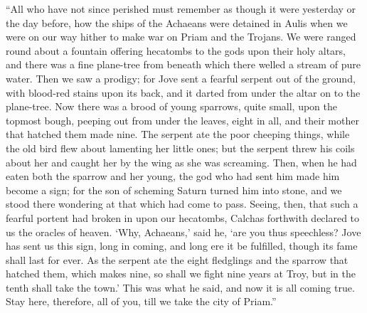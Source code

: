“All who have not since perished must remember as though it were yesterday
or the day before, how the ships of the Achaeans were detained in Aulis
when we were on our way hither to make war on Priam and the Trojans. We
were ranged round about a fountain offering hecatombs to the gods upon
their holy altars, and there was a fine plane-tree from beneath which
there welled a stream of pure water. Then we saw a prodigy; for Jove sent
a fearful serpent out of the ground, with blood-red stains upon its back,
and it darted from under the altar on to the plane-tree. Now there was a
brood of young sparrows, quite small, upon the topmost bough, peeping out
from under the leaves, eight in all, and their mother that hatched them
made nine. The serpent ate the poor cheeping things, while the old bird
flew about lamenting her little ones; but the serpent threw his coils
about her and caught her by the wing as she was screaming. Then, when he
had eaten both the sparrow and her young, the god who had sent him made
him become a sign; for the son of scheming Saturn turned him into stone,
and we stood there wondering at that which had come to pass. Seeing, then,
that such a fearful portent had broken in upon our hecatombs, Calchas
forthwith declared to us the oracles of heaven. ‘Why, Achaeans,’ said he,
‘are you thus speechless? Jove has sent us this sign, long in coming, and
long ere it be fulfilled, though its fame shall last for ever. As the
serpent ate the eight fledglings and the sparrow that hatched them, which
makes nine, so shall we fight nine years at Troy, but in the tenth shall
take the town.’ This was what he said, and now it is all coming true. Stay
here, therefore, all of you, till we take the city of Priam.”

